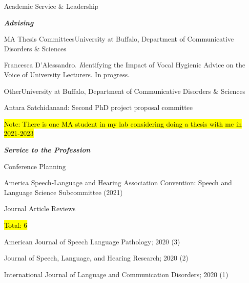 \documentclass{resume} %
\begin{document}
\begin{rSection}{Academic Service \& Leadership}

\bigskip
\begin{center}
	{\bf \emph{Advising}}\\
\end{center}

\begin{rSubsection}{MA Thesis Committees}{}{University at Buffalo, Department of Communicative Disorders \& Sciences}{}
	\item Francesca D'Alessandro. {\emph Identifying the Impact of Vocal Hygienic Advice on the Voice of University Lecturers}. In progress.
\end{rSubsection}

\begin{rSubsection}{Other}{}{University at Buffalo, Department of Communicative Disorders \& Sciences}{}
	\item Antara Satchidanand: Second PhD project proposal committee
	\item \hl{Note: There is one MA student in my lab considering doing a thesis with me in 2021-2023}
\end{rSubsection}



\bigskip
\begin{center}
	{\bf \emph{Service to the Profession}}\\
\end{center}

\begin{rSubsection}{Conference Planning}{}{}{}
	\item America Speech-Language and Hearing Association Convention: Speech and Language Science Subcommittee (2021)
\end{rSubsection}

\begin{rSubsection}{Journal Article Reviews}{}{}{}
	\item \hl{Total: 6}
	\item American Journal of Speech Language Pathology; 2020 (3)
	\item Journal of Speech, Language, and Hearing Research; 2020 (2)
	\item International Journal of Language and Communication Disorders; 2020 (1)
\end{rSubsection}


\end{rSection}
\end{document}
